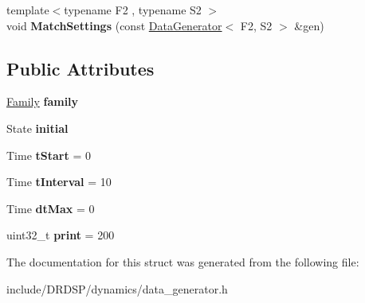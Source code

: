 \begin{DoxyCompactItemize}
\item 
\hypertarget{struct_d_r_d_s_p_1_1_data_generator_a617736ea54c49cca045295fd584f575b}{{\footnotesize template$<$typename F2 , typename S2 $>$ }\\void {\bfseries Match\-Settings} (const \hyperlink{struct_d_r_d_s_p_1_1_data_generator}{Data\-Generator}$<$ F2, S2 $>$ \&gen)}\label{struct_d_r_d_s_p_1_1_data_generator_a617736ea54c49cca045295fd584f575b}

\end{DoxyCompactItemize}
\subsection*{Public Attributes}
\begin{DoxyCompactItemize}
\item 
\hypertarget{struct_d_r_d_s_p_1_1_data_generator_a1c66f08a6c5e15f721dfd5cf05de44cc}{\hyperlink{struct_d_r_d_s_p_1_1_family}{Family} {\bfseries family}}\label{struct_d_r_d_s_p_1_1_data_generator_a1c66f08a6c5e15f721dfd5cf05de44cc}

\item 
\hypertarget{struct_d_r_d_s_p_1_1_data_generator_a452f2752ccfcbe601ab4f06c09971cc5}{State {\bfseries initial}}\label{struct_d_r_d_s_p_1_1_data_generator_a452f2752ccfcbe601ab4f06c09971cc5}

\item 
\hypertarget{struct_d_r_d_s_p_1_1_data_generator_a31210577ff8d44eb4bdebfdbf7204260}{Time {\bfseries t\-Start} = 0}\label{struct_d_r_d_s_p_1_1_data_generator_a31210577ff8d44eb4bdebfdbf7204260}

\item 
\hypertarget{struct_d_r_d_s_p_1_1_data_generator_a721cb3f6a161a1576ebbf63386ec6f87}{Time {\bfseries t\-Interval} = 10}\label{struct_d_r_d_s_p_1_1_data_generator_a721cb3f6a161a1576ebbf63386ec6f87}

\item 
\hypertarget{struct_d_r_d_s_p_1_1_data_generator_ad0930651c1f8a0b7806809777119d735}{Time {\bfseries dt\-Max} = 0}\label{struct_d_r_d_s_p_1_1_data_generator_ad0930651c1f8a0b7806809777119d735}

\item 
\hypertarget{struct_d_r_d_s_p_1_1_data_generator_a8b22578311e44bfa08a8c40ad70bd337}{uint32\-\_\-t {\bfseries print} = 200}\label{struct_d_r_d_s_p_1_1_data_generator_a8b22578311e44bfa08a8c40ad70bd337}

\end{DoxyCompactItemize}


The documentation for this struct was generated from the following file\-:\begin{DoxyCompactItemize}
\item 
include/\-D\-R\-D\-S\-P/dynamics/data\-\_\-generator.\-h\end{DoxyCompactItemize}
